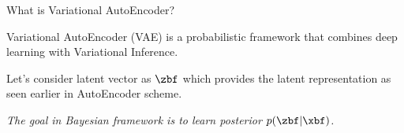 \documentclass[aspectratio=169,xcolor=dvipsnames,svgnames,x11names,fleqn]{beamer}
\begin{document}
\begin{frame}{What is Variational AutoEncoder?}

 \begin{tcolorbox}[vcLight, title=~]
    \color{vcDeep}
    
Variational AutoEncoder (VAE) is a probabilistic framework that combines deep learning with Variational Inference.
\end{tcolorbox}

Let's consider latent vector as $\zbf$ which provides the latent representation as seen earlier in AutoEncoder scheme.

\vspace{10pt}

\centering

\textit{The goal in Bayesian framework is to learn posterior $p(\zbf | \xbf)$.}

\end{frame}
\end{document}
